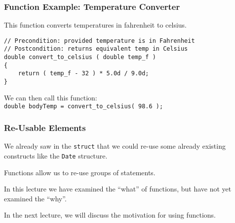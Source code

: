 \begin{frame}[fragile]
\frametitle{Function Example: Temperature Converter}

This function converts temperatures in fahrenheit to celsius.

\begin{verbatim}
// Precondition: provided temperature is in Fahrenheit
// Postcondition: returns equivalent temp in Celsius
double convert_to_celsius ( double temp_f )
{
    return ( temp_f - 32 ) * 5.0d / 9.0d;
}
\end{verbatim}

We can then call this function:\\
\quad \texttt{double bodyTemp = convert\_to\_celsius( 98.6 );}

\end{frame}

\begin{frame}[fragile]
\frametitle{Re-Usable Elements}
We already saw in the \texttt{struct} that we could re-use some already existing constructs like the \texttt{Date} structure.

Functions allow us to re-use groups of statements.

In this lecture we have examined the ``what'' of functions, but have not yet examined the ``why''.

In the next lecture, we will discuss the motivation for using functions.


\end{frame}




